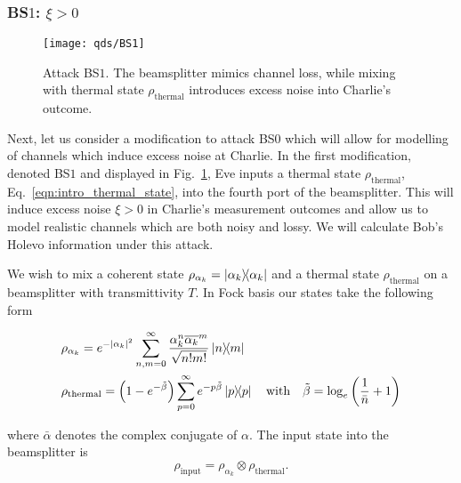 \subsubsection{BS$1$: $\xi > 0$}\label{sec:qds_bs1}
\begin{figure}[htp]
\centering
\texttt{[image: qds/BS1]}
\caption{\label{fig:bs1_attack} Attack BS$1$. The beamsplitter mimics channel loss, while mixing with thermal state $\rho_{\text{thermal}}$ introduces excess noise into Charlie's outcome.}
\end{figure}
Next, let us consider a modification to attack BS$0$ which will allow for modelling of channels which induce excess noise at Charlie. In the first modification, denoted BS$1$ and displayed in Fig.~\ref{fig:bs1_attack}, Eve inputs a thermal state $\rho_{\text{thermal}}$, Eq.~\ref{eqn:intro_thermal_state}, into the fourth port of the beamsplitter. %
This will induce excess noise $\xi > 0$ in Charlie's measurement outcomes and allow us to model realistic channels which are both noisy and lossy. We will calculate Bob's Holevo information under this attack.

We wish to mix a coherent state $\rho_{\alpha_k} = \dyad{\alpha_k}$ and a thermal state $\rho_{\text{thermal}}$ on a beamsplitter with transmittivity $T$. In Fock basis our states take the following form

\begin{align}
&\rho_{\alpha_k} = e^{-\left|\alpha_k\right|^2} \sum_{n, m=0}^{\infty} \frac{\alpha_k^n \overline{\alpha_k}^{m}}{\sqrt{n! m!}} \dyad{n}{m} \notag \\
&\rho_{\text{thermal}} = \left(1 - e^{-\tilde{\beta}}\right) \sum_{p=0}^\infty e^{- p \tilde{\beta}}\dyad{p} \qq{with} \tilde{\beta} = \log_e\left(\frac{1}{\bar{n}} +1\right)
\end{align}

\noindent where $\bar{\alpha}$ denotes the complex conjugate of $\alpha$. The input state into the beamsplitter is
\begin{equation}\label{eqn:qds_bs1_input_state}
\rho_{\text{input}} = \rho_{\alpha_k} \otimes \rho_{\text{thermal}}.
\end{equation}

